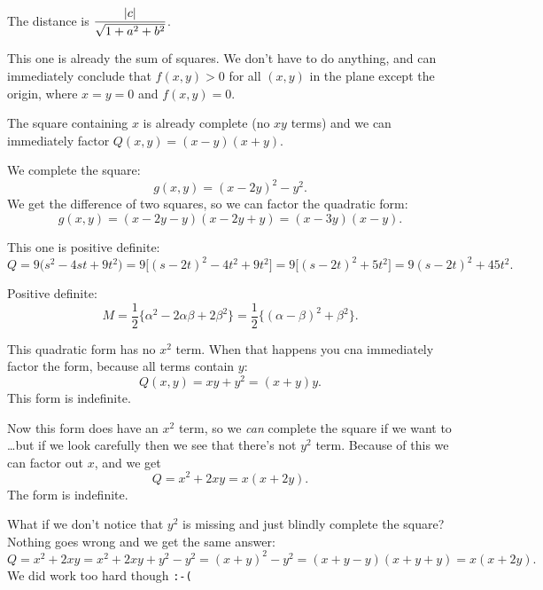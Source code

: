 \item[{\bfseries(III5.4)}]

The distance is $\displaystyle \frac{|c|}{\sqrt{1+a^2+b^2}}$.
\bigskip

\item[{\bfseries(III5.5a)}]

This one is already the sum of squares.  We don't have to do anything, and can
immediately conclude that $f(x, y)>0$ for all $(x,y)$ in the plane except the origin,
where $x=y=0$ and $f(x, y) = 0$.
\bigskip

\item[{\bfseries(III5.5b)}]

The square containing $x$ is already complete (no $xy$ terms) and we can immediately
factor $Q(x, y) = (x-y)(x+y)$.
\bigskip

\item[{\bfseries(III5.5c)}]

We complete the square:
\[
  g(x, y) = (x-2y)^2 - y^2.
\]
We get the difference of two squares, so we can factor the quadratic form:
\[
  g(x, y) = (x-2y - y) (x-2y + y) = (x-3y)(x-y).
\]
\bigskip

\item[{\bfseries(III5.5d)}]

This one is positive definite:
\[
  Q
  = 9\bigl( s^2 - 4st + 9 t^2\bigr)
  = 9\bigl[ (s - 2t)^2 -4t^2 + 9 t^2\bigr]
  = 9\bigl[ (s - 2t)^2 + 5 t^2\bigr]
  =9(s-2t)^2 + 45 t^2.
\]
\bigskip

\item[{\bfseries(III5.5e)}]

Positive definite:
\[
  M = \frac12\bigl\{\alpha^2- 2\alpha\beta + 2\beta^2\bigr\}
  =\frac12 \bigl\{(\alpha-\beta)^2 + \beta^2\bigr\}.
\]
\bigskip

\item[{\bfseries(III5.5f)}]

This quadratic form has no $x^2$ term.  When that happens you cna immediately factor
the form, because all terms contain $y$:
\[
Q(x,y) = xy+y^2 = (x+y)y.
\]
This form is indefinite.
\bigskip

\item[{\bfseries(III5.5g)}]

Now this form does have an $x^2$ term, so we \textit{can} complete the square if we
want to \dots but if we look carefully then we see that there's not $y^2$ term.
Because of this we can factor out $x$, and we get
\[
  Q = x^2+2xy = x(x+2y).
\]
The form is indefinite.

What if we don't notice that $y^2$ is missing and just blindly complete the square?
Nothing goes wrong and we get the same answer:
\[
  Q = x^2+2xy = x^2+ 2xy +y^2 - y^2 = (x+y)^2 - y^2 = (x+y - y)(x+y+y) = x(x+2y).
\]
We did work too hard though \verb|:-(|
\bigskip

